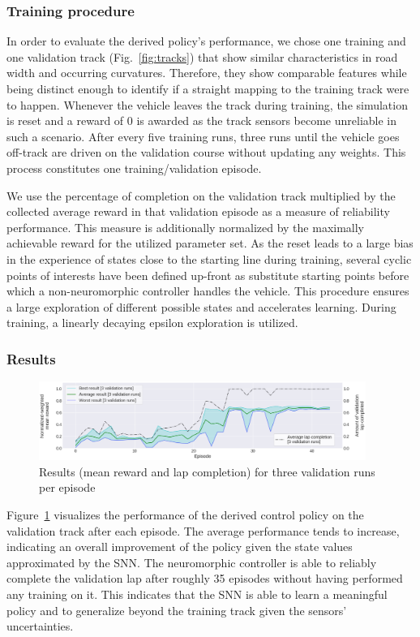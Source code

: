 \subsubsection{Training procedure}%
\label{ssubsec:training_procedure}

In order to evaluate the derived policy's performance, we chose one training and one validation track (Fig.~\ref{fig:tracks}) that show similar characteristics in road width and occurring curvatures. 
Therefore, they show comparable features while being distinct enough to identify if a straight mapping to the training track were to happen.
Whenever the vehicle leaves the track during training, the simulation is reset and a reward of \num{0} is awarded as the track sensors become unreliable in such a scenario.
After every five training runs, three runs until the vehicle goes off-track are driven on the validation course without updating any weights. This process constitutes one training/validation episode.

We use the percentage of completion on the validation track multiplied by the collected average reward in that validation episode as a measure of reliability performance. 
This measure is additionally normalized by the maximally achievable reward for the utilized parameter set.
As the reset leads to a large bias in the experience of states close to the starting line during training, several cyclic points of interests have been defined up-front as substitute starting points before which a non-neuromorphic controller handles the vehicle.
This procedure ensures a large exploration of different possible states and accelerates learning. 
During training, a linearly decaying epsilon exploration is utilized.

\subsubsection{Results}%
\label{ssubsec:results}

\begin{figure}[t!]
\centering
  \includegraphics[width=0.95\textwidth]{imgs/CG1-val-updated.eps}
\caption{Results (mean reward and lap completion) for three validation runs per episode \label{fig:results}}
\end{figure}
Figure~\ref{fig:results} visualizes the performance of the derived control policy on the validation track after each episode.
The average performance tends to increase, indicating an overall improvement of the policy given the state values approximated by the \ac{SNN}.
The neuromorphic controller is able to reliably complete the validation lap after roughly \num{35} episodes without having performed any training on it.
This indicates that the \ac{SNN} is able to learn a meaningful policy and to generalize beyond the training track given the sensors' uncertainties.


